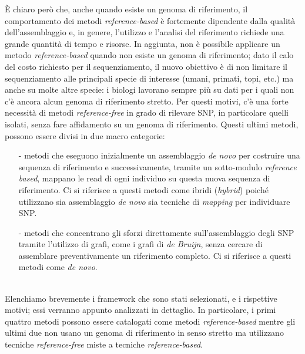 \documentclass[../main.tex]{subfiles}
\begin{document}
È chiaro però che, anche quando esiste un genoma di riferimento, il comportamento dei metodi \textit{reference-based} è fortemente dipendente dalla qualità dell'assemblaggio e, in genere, l'utilizzo e l'analisi del riferimento richiede una grande quantità di tempo e risorse. In aggiunta, non è possibile applicare un metodo \textit{reference-based} quando non esiste un genoma di riferimento; dato il calo del costo richiesto per il sequenziamento, il nuovo obiettivo è di non limitare il sequenziamento alle principali specie di interesse (umani, primati, topi, etc.) ma anche su molte altre specie: i biologi lavorano sempre più su dati per i quali non c'è ancora alcun genoma di riferimento stretto. Per questi motivi, c'è una forte necessità di metodi \textit{reference-free} in grado di rilevare SNP, in particolare quelli isolati, senza fare affidamento su un genoma di riferimento. Questi ultimi metodi, possono essere divisi in due macro categorie:
\begin{itemize} 
\item[-] metodi che eseguono inizialmente un assemblaggio \textit{de novo} per costruire una sequenza di riferimento e successivamente, tramite un sotto-modulo \textit{reference based}, mappano le read di ogni individuo su questa nuova sequenza di riferimento. Ci si riferisce a questi metodi come ibridi (\textit{hybrid}) poiché utilizzano sia assemblaggio \textit{de novo} sia tecniche di \textit{mapping} per individuare SNP.
\item[-] metodi che concentrano gli sforzi direttamente sull'assemblaggio degli SNP tramite l'utilizzo di grafi, come i grafi di \textit{de Bruijn}, senza cercare di assemblare preventivamente un riferimento completo. Ci si riferisce a questi metodi come \textit{de novo}.
\end{itemize}

\noindent
\\Elenchiamo brevemente i framework che sono stati selezionati, e i rispettive motivi; essi verranno appunto analizzati in dettaglio. In particolare, i primi quattro metodi possono essere catalogati come metodi \textit{reference-based} mentre gli ultimi due non usano un genoma di riferimento in senso stretto ma utilizzano tecniche \textit{reference-free} miste a tecniche \textit{reference-based}.
\end{document}
